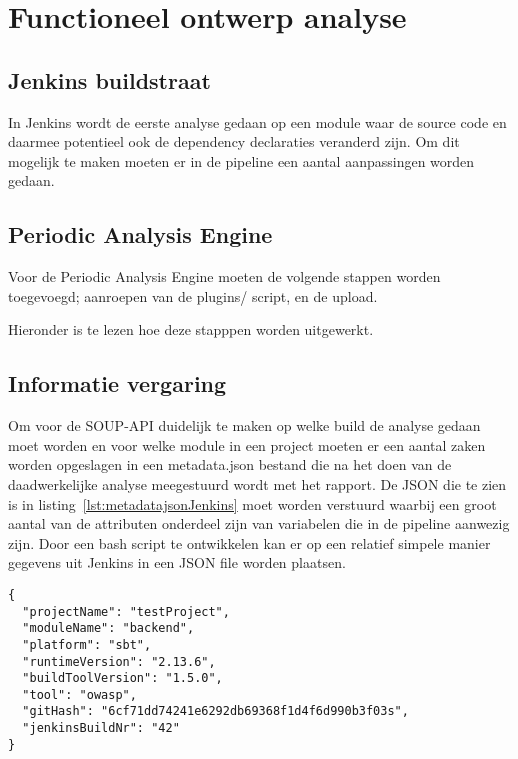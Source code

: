 \chapter{Functioneel ontwerp analyse}\label{ch:impl-Jenkins}

\section{Jenkins buildstraat}\label{sec:jenkins-buildtstraat}
In Jenkins wordt de eerste analyse gedaan op een module waar de source code en daarmee potentieel ook de dependency declaraties veranderd zijn.
Om dit mogelijk te maken moeten er in de pipeline een aantal aanpassingen worden gedaan.

\section{Periodic Analysis Engine}\label{sec:pae-builstraat}
Voor de Periodic Analysis Engine moeten de volgende stappen worden toegevoegd; aanroepen van de plugins/ script, en de upload.

Hieronder is te lezen hoe deze stapppen worden uitgewerkt.

\section{Informatie vergaring}\label{sec:informatie-vergaring}
Om voor de SOUP-API duidelijk te maken op welke build de analyse gedaan moet worden en voor welke module in een project moeten er een aantal zaken worden opgeslagen in een metadata.json bestand die na het doen van de daadwerkelijke analyse meegestuurd wordt met het rapport. De JSON die te zien is in listing~\ref{lst:metadatajsonJenkins} moet worden verstuurd waarbij een groot aantal van de attributen onderdeel zijn van variabelen die in de pipeline aanwezig zijn.
Door een bash script te ontwikkelen kan er op een relatief simpele manier gegevens uit Jenkins in een JSON file worden plaatsen.

\begin{lstlisting}[caption={metadata JSON object behorende bij de case class}, label={lst:metadatajsonJenkins},captionpos=b]
{
  "projectName": "testProject",
  "moduleName": "backend",
  "platform": "sbt",
  "runtimeVersion": "2.13.6",
  "buildToolVersion": "1.5.0",
  "tool": "owasp",
  "gitHash": "6cf71dd74241e6292db69368f1d4f6d990b3f03s",
  "jenkinsBuildNr": "42"
}
\end{lstlisting}


